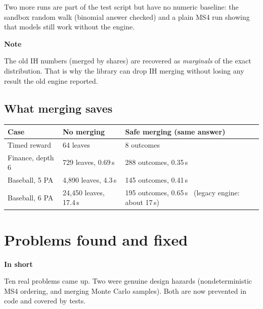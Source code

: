 \documentclass[11pt]{article}
\newcommand{\shadedbox}[3]{\par\smallskip\noindent\colorbox{#1}{\parbox{\dimexpr\linewidth-2\fboxsep}{\textbf{#2}\par #3}}\par\smallskip}
\newcommand{\takeaway}[1]{\shadedbox{okbg}{In short}{#1}}
\newcommand{\note}[1]{\shadedbox{notebg}{Note}{#1}}
\begin{document}
Two more runs are part of the test script but have no numeric baseline: the sandbox random walk (binomial answer
checked) and a plain MS4 run showing that models still work without the engine.

\note{The old IH numbers (merged by shares) are recovered as \emph{marginals} of the exact distribution. That is why
the library can drop IH merging without losing any result the old engine reported.}

\subsection{What merging saves}
\begin{tabularx}{\linewidth}{@{}lYY@{}}
\toprule
\textbf{Case} & \textbf{No merging} & \textbf{Safe merging (same answer)}\\
\midrule
Timed reward & 64 leaves & 8 outcomes\\
Finance, depth 6 & 729 leaves, 0.69\,s & 288 outcomes, 0.35\,s\\
Baseball, 5 PA & 4{,}890 leaves, 4.3\,s & 145 outcomes, 0.41\,s\\
Baseball, 6 PA & 24{,}450 leaves, 17.4\,s & 195 outcomes, 0.65\,s \ (legacy engine: about 17\,s)\\
\bottomrule
\end{tabularx}

\section{Problems found and fixed}\label{sec:issues}

\takeaway{Ten real problems came up. Two were genuine design hazards (nondeterministic MS4 ordering, and merging
Monte Carlo samples). Both are now prevented in code and covered by tests.}
\end{document}
